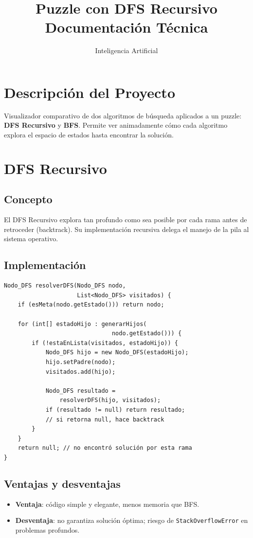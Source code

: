 \documentclass[12pt,a4paper]{article}
\title{\textbf{Puzzle con DFS Recursivo}\\
  \large Documentación Técnica}
\author{Inteligencia Artificial}
\date{}
\begin{document}
\maketitle
\tableofcontents
\newpage

\section{Descripción del Proyecto}
Visualizador comparativo de dos algoritmos de búsqueda aplicados a un puzzle: \textbf{DFS Recursivo} y \textbf{BFS}. Permite ver animadamente cómo cada algoritmo explora el espacio de estados hasta encontrar la solución.

\section{DFS Recursivo}

\subsection{Concepto}
El DFS Recursivo explora tan profundo como sea posible por cada rama antes de retroceder (backtrack). Su implementación recursiva delega el manejo de la pila al sistema operativo.

\subsection{Implementación}
\begin{lstlisting}
Nodo_DFS resolverDFS(Nodo_DFS nodo,
                     List<Nodo_DFS> visitados) {
    if (esMeta(nodo.getEstado())) return nodo;

    for (int[] estadoHijo : generarHijos(
                               nodo.getEstado())) {
        if (!estaEnLista(visitados, estadoHijo)) {
            Nodo_DFS hijo = new Nodo_DFS(estadoHijo);
            hijo.setPadre(nodo);
            visitados.add(hijo);

            Nodo_DFS resultado =
                resolverDFS(hijo, visitados);
            if (resultado != null) return resultado;
            // si retorna null, hace backtrack
        }
    }
    return null; // no encontró solución por esta rama
}
\end{lstlisting}

\subsection{Ventajas y desventajas}
\begin{itemize}
  \item \textbf{Ventaja}: código simple y elegante, menos memoria que BFS.
  \item \textbf{Desventaja}: no garantiza solución óptima; riesgo de \texttt{StackOverflowError} en problemas profundos.
\end{itemize}
\end{document}
